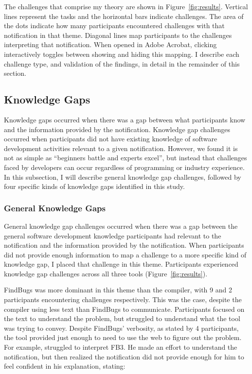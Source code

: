 The challenges that comprise my theory are 
shown in Figure~\ref{fig:results}.
Vertical lines represent the tasks and the horizontal bars indicate challenges.
The area of the dots indicate how many participants encountered challenges with that notification in that theme. 
Diagonal lines map participants to the challenges interpreting that notification.
\setlength\fboxsep{1pt}
When opened in Adobe Acrobat, clicking  
interactively toggles between showing and hiding this mapping.
I describe each challenge type, and validation of the findings, in detail in the remainder of this section.

\subsection{Knowledge Gaps}\label{subsec:gaps}

Knowledge gaps occurred when there was a gap between what participants know and the information provided by the notification. 
Knowledge gap challenges occurred when participants did not have existing knowledge of software 
development activities relevant to a given notification.  
However, we found it is not as simple as ``beginners battle and experts excel'', 
but instead that challenges faced by developers can occur regardless of programming or industry experience. 
In this subsection, I will describe general knowledge gap challenges, followed by four specific kinds of knowledge gaps identified in this study.

\subsubsection{General Knowledge Gaps}\label{subsec:infogap}
General knowledge gap challenges occurred when there was a gap between the general 
software development knowledge participants had relevant to the notification and the 
information provided by the notification.  
When participants did not provide enough information to map a challenge to a 
more specific kind of knowledge gap, I placed that challenge in this theme.
Participants experienced knowledge gap challenges across all three tools (Figure~\ref{fig:results}). 

FindBugs was more dominant in this theme than the compiler, with 9 and 2 participants encountering challenges respectively. This was the case, despite the compiler using less text than FindBugs to communicate. Participants focused on the text to understand the problem, but struggled to understand what the tool was trying to convey. Despite FindBugs' verbosity, as stated by 4 participants, the tool provided just enough to need to use the web to figure out the problem. For example,  struggled to interpret FB3. He made an effort to understand the notification, but then realized the notification did not provide enough for him to feel confident in his explanation, stating:

